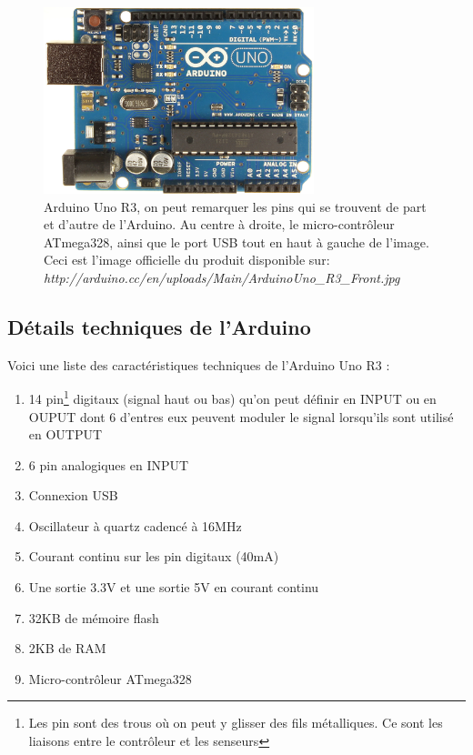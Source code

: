\documentclass[a4paper,11pt]{report}
\begin{document}
{\begin{figure}[h]
\begin{center}
\includegraphics[width = 0.7\textwidth]{arduino_uno_official.jpg}
\caption[Arduino Uno R3]{Arduino Uno R3\label{fig:ArduinoUnoR3}, on peut
  remarquer les pins  \label{pin} qui se trouvent de part et d'autre de
  l'Arduino. Au centre à droite, le micro-contrôleur ATmega328, ainsi
  que le port USB tout en haut à gauche de l'image. Ceci est l'image
  officielle du produit disponible sur: \small{\emph{http://arduino.cc/en/uploads/Main/ArduinoUno\_R3\_Front.jpg}}} 
\end{center}
\end{figure}


\subsection{Détails techniques de l'Arduino}

Voici une liste des caractéristiques techniques de l'Arduino Uno R3 \cite{Arduino}:
\begin{enumerate}
\item 14 pin\footnote{Les pin sont des trous où on peut y glisser des fils métalliques. Ce sont les liaisons entre le contrôleur et les senseurs} digitaux (signal haut ou bas) qu'on peut définir en INPUT ou en OUPUT dont 6 d'entres eux peuvent moduler le signal lorsqu'ils sont utilisé en OUTPUT
\item  6 pin analogiques en INPUT
\item Connexion USB
\item Oscillateur à quartz cadencé à 16MHz
\item Courant continu sur les pin digitaux (40mA)
\item Une sortie 3.3V et une sortie 5V en courant continu
\item 32KB de mémoire flash
\item 2KB de RAM
\item Micro-contrôleur ATmega328
\end{enumerate}
}
\end{document}
